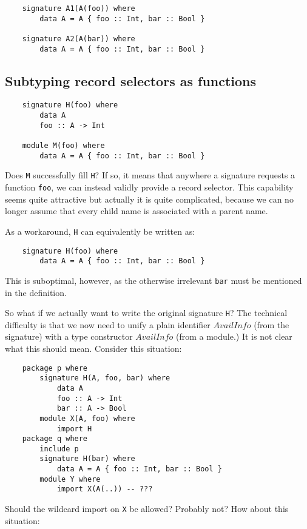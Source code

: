 \documentclass{article}
\newcommand{\I}[1]{\ensuremath{\mathit{#1}}}
\begin{document}
\begin{verbatim}
    signature A1(A(foo)) where
        data A = A { foo :: Int, bar :: Bool }

    signature A2(A(bar)) where
        data A = A { foo :: Int, bar :: Bool }
\end{verbatim}

\subsection{Subtyping record selectors as functions}

\begin{verbatim}
    signature H(foo) where
        data A
        foo :: A -> Int

    module M(foo) where
        data A = A { foo :: Int, bar :: Bool }
\end{verbatim}
%
Does \verb|M| successfully fill \verb|H|?  If so, it means that anywhere
a signature requests a function \verb|foo|, we can instead validly
provide a record selector.  This capability seems quite attractive
but actually it is quite complicated, because we can no longer assume
that every child name is associated with a parent name.

As a workaround, \verb|H| can equivalently be written as:

\begin{verbatim}
    signature H(foo) where
        data A = A { foo :: Int, bar :: Bool }
\end{verbatim}
%
This is suboptimal, however, as the otherwise irrelevant \verb|bar| must be mentioned
in the definition.

So what if we actually want to write the original signature \verb|H|?
The technical difficulty is that we now need to unify a plain identifier
\I{AvailInfo} (from the signature) with a type constructor \I{AvailInfo}
(from a module.)  It is not clear what this should mean.
Consider this situation:

\begin{verbatim}
    package p where
        signature H(A, foo, bar) where
            data A
            foo :: A -> Int
            bar :: A -> Bool
        module X(A, foo) where
            import H
    package q where
        include p
        signature H(bar) where
            data A = A { foo :: Int, bar :: Bool }
        module Y where
            import X(A(..)) -- ???
\end{verbatim}

Should the wildcard import on \verb|X| be allowed?  Probably not?
How about this situation:
\end{document}
